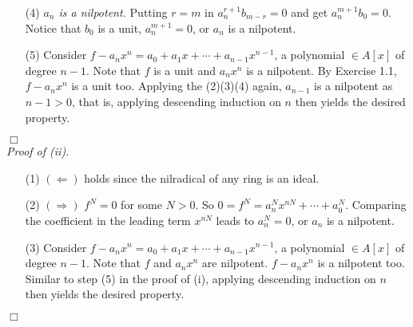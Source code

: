 \documentclass{article}
\begin{document}
\begin{enumerate}
\item[(4)]
  \emph{$a_n$ is a nilpotent.}
  Putting $r = m$ in $a_n^{r+1} b_{m-r} = 0$ and get $a_n^{m+1} b_0 = 0$.
  Notice that $b_0$ is a unit, $a_n^{m+1} = 0$, or $a_n$ is a nilpotent.

\item[(5)]
  Consider $f - a_n x^n = a_0 + a_1 x + \cdots + a_{n-1} x^{n-1}$,
  a polynomial $\in A[x]$ of degree $n-1$.
  Note that $f$ is a unit and $a_n x^n$ is a nilpotent.
  By Exercise 1.1, $f - a_n x^n$ is a unit too.
  Applying the (2)(3)(4) again, $a_{n-1}$ is a nilpotent as $n-1 > 0$,
  that is, applying descending induction on $n$ then yields the desired property.
\end{enumerate}
$\Box$ \\



\emph{Proof of (ii).}
\begin{enumerate}
\item[(1)]
  $(\Longleftarrow)$ holds since the nilradical of any ring is an ideal.

\item[(2)]
  $(\Longrightarrow)$ $f^N = 0$ for some $N > 0$.
  So $0 = f^N = a_n^N x^{nN} + \cdots + a_0^N$.
  Comparing the coefficient in the leading term $x^{nN}$ leads to $a_n^N = 0$,
  or $a_n$ is a nilpotent.

\item[(3)]
  Consider $f - a_n x^n = a_0 + a_1 x + \cdots + a_{n-1} x^{n-1}$,
  a polynomial $\in A[x]$ of degree $n-1$.
  Note that $f$ and $a_n x^n$ are nilpotent.
  $f - a_n x^n$ is a nilpotent too.
  Similar to step (5) in the proof of (i),
  applying descending induction on $n$ then yields the desired property.
\end{enumerate}
$\Box$ \\
\end{document}
